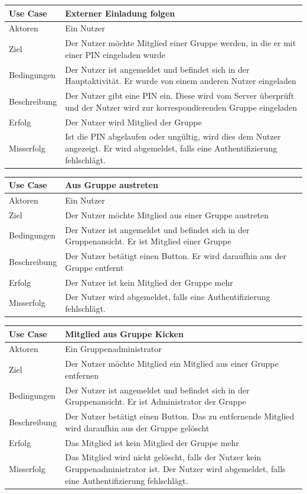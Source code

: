 \begin{tabular}{|p{}|p{}|}
\hline
\textbf{Use Case} & \textbf{Externer Einladung folgen} \\ \hline
Aktoren &  Ein Nutzer \\ \hline
Ziel &  Der Nutzer möchte Mitglied einer Gruppe werden, in die er mit einer PIN eingeladen wurde \\ \hline
Bedingungen &  Der Nutzer ist angemeldet und befindet sich in der Hauptaktivität. Er wurde von einem anderen Nutzer eingeladen \\ \hline
Beschreibung & Der Nutzer gibt eine PIN ein. Diese wird vom Server überprüft und der Nutzer wird zur korrespondierenden Gruppe eingeladen \\ \hline
Erfolg & Der Nutzer wird Mitglied der Gruppe \\ \hline
Misserfolg & Ist die PIN abgelaufen oder ungültig, wird dies dem Nutzer angezeigt. Er wird abgemeldet, falls eine Authentifizierung fehlschlägt. \\ \hline
\hline \end{tabular}
\begin{tabular}{|p{}|p{}|}
\hline
\textbf{Use Case} & \textbf{Aus Gruppe austreten} \\ \hline
Aktoren &  Ein Nutzer \\ \hline
Ziel &  Der Nutzer möchte Mitglied aus einer Gruppe austreten\\ \hline
Bedingungen &  Der Nutzer ist angemeldet und befindet sich in der Gruppenansicht. Er ist Mitglied einer Gruppe \\ \hline
Beschreibung & Der Nutzer betätigt einen Button. Er wird daraufhin aus der Gruppe entfernt \\ \hline
Erfolg & Der Nutzer ist kein Mitglied der Gruppe mehr \\ \hline
Misserfolg & Der Nutzer wird abgemeldet, falls eine Authentifizierung fehlschlägt. \\ \hline
\hline \end{tabular}
\begin{tabular}{|p{}|p{}|}
\hline
\textbf{Use Case} & \textbf{Mitglied aus Gruppe Kicken} \\ \hline
Aktoren &  Ein Gruppenadministrator \\ \hline
Ziel &  Der Nutzer möchte Mitglied ein Mitglied aus einer Gruppe entfernen \\ \hline
Bedingungen &  Der Nutzer ist angemeldet und befindet sich in der Gruppenansicht. Er ist Administrator der Gruppe \\ \hline
Beschreibung & Der Nutzer betätigt einen Button. Das zu entfernende Mitglied wird daraufhin aus der Gruppe gelöscht \\ \hline
Erfolg & Das Mitglied ist kein Mitglied der Gruppe mehr \\ \hline
Misserfolg & Das Mitglied wird nicht gelöscht, falls der Nutzer kein Gruppenadministrator ist. Der Nutzer wird abgemeldet, falls eine Authentifizierung fehlschlägt. \\ \hline
\hline \end{tabular}
